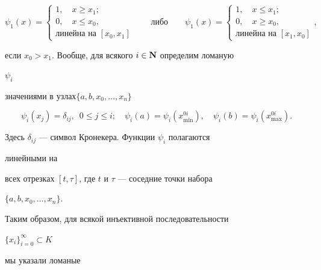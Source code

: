 $$


\psi_1(x)=


\begin{cases}


1,\quad x\ge x_1;\\


0,\quad x\le x_0,\\


\text{линейна на }[x_0,x_1]


\end{cases}


\qquad


\text{либо}


\qquad


\psi_1(x)=


\begin{cases}


1,\quad x\le x_1; \\


0,\quad x\ge x_0, \\


\text{линейна на }[x_1,x_0]


\end{cases}


,


$$


если $x_0>x_1$. Вообще, для всякого $i\in\bold N$ определим ломаную


$\psi_i$


значениями в узлах\linebreak $\{a,b,x_0,\dotsc,x_n\}$


\begin{equation}


\psi_i(x_j)=\delta_{ij},\ \; 0\le j\le i;\quad


\psi_i(a)=\psi_i(x^{0i}_{\min}),\quad


\psi_i(b)=\psi_i(x^{0i}_{\max}).


\end{equation}


Здесь $\delta_{ij}$ --- символ Кронекера. Функции $\psi_i$ полагаются


линейными на


всех отрезках $[t,\tau]$, где $t$ и $\tau$ --- соседние точки набора


$\{a,b,x_0,\dotsc,x_n\}$.


Таким образом, для всякой инъективной последовательности


$\{x_i\}^\infty_{i=0}\subset K$


мы указали ломаные


